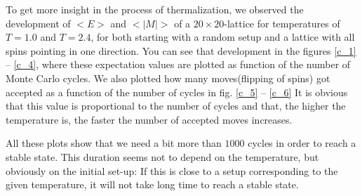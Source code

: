\documentclass[10pt,a4paper]{article}
\begin{document}
To get more insight in the process of thermalization, we observed the development of $<E>$ and $<|M|>$ of a $20\times20$-lattice for temperatures of $T=1.0$ and $T=2.4$, for both starting with a random setup and a lattice with all spins pointing in one direction. You can see that development in the figures \ref{c_1} -- \ref{c_4}, where these expectation values are plotted as function of the number of Monte Carlo cycles. We also plotted how many \glq moves\grq (flipping of spins) got accepted as a function of the number of cycles in fig. \ref{c_5} -- \ref{c_6} It is obvious that this value is proportional to the number of cycles and that, the higher the temperature is, the faster the number of accepted moves increases.

All these plots show that we need a bit more than $1000$ cycles in order to reach a stable state. This duration seems not to depend on the temperature, but obviously on the initial set-up: If this is close to a setup corresponding to the given temperature, it will not take long time to reach a stable state.
\end{document}
